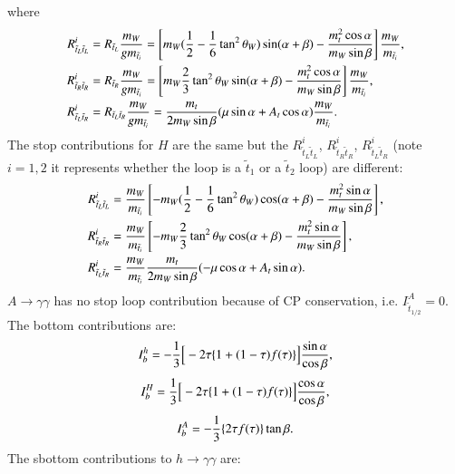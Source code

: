 \documentclass[final,3p,times,pdflatex]{elsarticle}
\begin{document}
where
\begin{align}
R_{\tilde{t}_L \tilde{t}_L}^i &= R_{\tilde{t}_L} {m_{W} \over g m_{\tilde{t}_i}} = \left[m_W ({1 \over 2}-{1 \over 6}\tan^2 \theta_W)\sin(\alpha+\beta) - {m_{t}^2 \cos \alpha \over m_{W} \sin \beta}\right]{m_W \over  m_{\tilde{t}_i}}, \\
R_{\tilde{t}_R \tilde{t}_R}^i &= R_{\tilde{t}_R} {m_{W} \over g m_{\tilde{t}_i}} = \left[m_W{2 \over 3} \tan^2 \theta_W  \sin(\alpha+\beta) - {m_{t}^2 \cos \alpha \over m_{W} \sin \beta}\right]{m_W \over m_{\tilde{t}_i}}, \\
R_{\tilde{t}_L \tilde{t}_R}^i &= R_{\tilde{t}_L \tilde{t}_R} {m_W \over g m_{\tilde{t}_i}} = {m_t \over 2 m_W \sin\beta}(\mu \sin\alpha + A_t \cos\alpha){m_W \over m_{\tilde{t}_i}}.
\end{align}
The stop contributions for $H$ are the same but the $R_{\tilde{t}_L \tilde{t}_L}^i$, $R_{\tilde{t}_R \tilde{t}_R}^i$,  $R_{\tilde{t}_L \tilde{t}_R}^i$ (note $i=1,2$ it represents whether the loop is a $\tilde{t}_1$ or a $\tilde{t}_2$ loop) are different:
\begin{align}
R_{\tilde{t}_L \tilde{t}_L}^i &= {m_{W} \over m_{\tilde{t}_i}}\left[-m_W ({1 \over 2} - {1 \over 6}\tan^2 \theta_W)\cos(\alpha+\beta) -{m_{t}^2 \sin\alpha \over m_{W}\sin\beta}\right], \\
R_{\tilde{t}_R \tilde{t}_R}^i &= {m_{W} \over m_{\tilde{t}_i}}\left[-m_W {2 \over 3}\tan^2 \theta_W\cos(\alpha+\beta) -{m_{t}^2 \sin\alpha \over m_{W}\sin\beta}\right], \\
R_{\tilde{t}_L \tilde{t}_R}^i &= {m_W \over m_{\tilde{t}_i}} {m_t \over 2 m_W \sin\beta}(-\mu \cos\alpha + A_t \sin\alpha).
\end{align}
$A \rightarrow \gamma \gamma$ has no stop loop contribution because of CP conservation, i.e. $I_{\tilde{t}_{1/2}}^A = 0$.
The bottom contributions are:
\begin{equation}
I_{b}^h = -{1 \over 3}\Big[-2\tau\{1+(1-\tau)f(\tau)\}\Big]{\sin\alpha \over \cos\beta},
\end{equation}
\begin{equation}
I_{b}^H = {1 \over 3}\Big[-2\tau\{1+(1-\tau)f(\tau)\}\Big]{\cos\alpha \over \cos\beta},
\end{equation}
\begin{equation}
I_{b}^A = -{1 \over 3}\{2\tau f(\tau)\}\tan\beta.
\end{equation}
The sbottom contributions to $h \rightarrow \gamma \gamma$ are:
\end{document}
